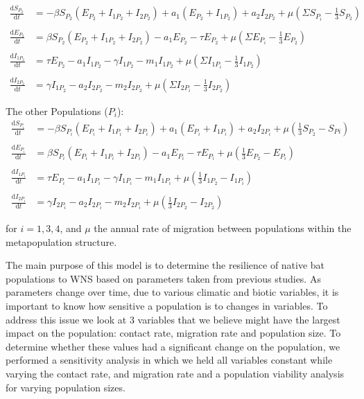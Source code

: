 \documentclass[12pt]{article}
\begin{document}
    \begin{align*}
                \frac{\mathrm{d}S_{P_2}}{\mathrm{d}t} & = -\beta S_{P_2} (E_{P_2}+ I_{1P_2} + I_{2P_2}) + a_1(E_{P_2}+I_{1P_2}) + a_2I_{2P_2} + \mu (\Sigma  S_{P_i} - \frac{1}{3}S_{P_2})
            \\\\
                \frac{\mathrm{d}E_{P_2}}{\mathrm{d}t} & = \beta S_{P_2} (E_{P_2} + I_{1P_2} + I_{2P_2}) - a_1 E_{P_2} - \tau E_{P_2} + \mu (\Sigma  E_{P_i} - \frac{1}{3}E_{P_2})
            \\            \\
                \frac{\mathrm{d}I_{1P_2}}{\mathrm{d}t} & = \tau E_{P_2} - a_1 I_{1P_2} - \gamma I_{1P_2} - m_1 I_{1P_2} + \mu (\Sigma  I_{1P_i} - \frac{1}{3}I_{1P_2})
            \\            \\
                \frac{\mathrm{d}I_{2P_2}}{\mathrm{d}t} & =  \gamma I_{1P_2} - a_2 I_{2P_2} - m_2 I_{2P_2} + \mu (\Sigma I_{2P_i} - \frac{1}{3}I_{2P_2})
    \end{align*}
     
The other Populations ($P_i$):
    \begin{align*}
                \frac{\mathrm{d}S_{P_i}}{\mathrm{d}t} & = -\beta S_{P_i} (E_{P_i} + I_{1P_i} + I_{2P_i}) + a_1(E_{P_i}+I_{1P_i}) + a_2I_{2P_i} + \mu (\frac{1}{3}S_{P_2}- S_{Pi})
            \\\\
                \frac{\mathrm{d} E_{P_i}}{\mathrm{d}t} & = \beta S_{P_i}(E_{P_i} + I_{1P_i} + I_{2P_i}) - a_1 E_{P_i} - \tau E_{P_i} + \mu (\frac{1}{3}E_{P_2}- E_{P_i})
            \\            \\
                \frac{\mathrm{d}I_{1P_i}}{\mathrm{d}t} & = \tau E_{P_i} - a_1 I_{1P_i} - \gamma I_{1P_i} - m_1 I_{1P_i} + \mu (\frac{1}{3}I_{1P_2}- I_{1P_i})
            \\            \\
                \frac{\mathrm{d}I_{2P_i}}{\mathrm{d}t} & =  \gamma I_{2P_i} - a_2 I_{2P_i} - m_2 I_{2P_i} + \mu (\frac{1}{3}I_{2P_2}- I_{2P_2})
    \end{align*}

for $i = 1, 3, 4$, and $\mu$ the annual rate of migration between populations within the metapopulation structure.
	
The main purpose of this model is to determine the resilience of native bat populations to WNS based on parameters taken from previous studies. As parameters change over time, due to various climatic and biotic variables, it is important to know how sensitive a population is to  changes in variables. To address this issue we look at 3 variables that we believe might have the largest impact on the population: contact rate, migration rate and population size. To determine whether these values had a significant change on the population, we performed a sensitivity analysis in which we held all variables constant while varying the contact rate,  and migration rate and a population viability analysis for varying population sizes.
\end{document}
